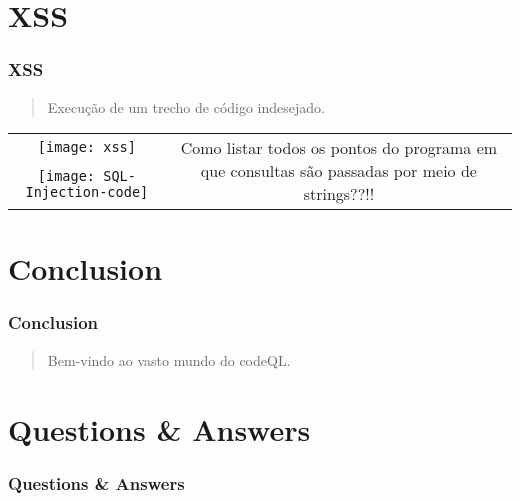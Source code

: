 \documentclass[10pt, aspectratio=169]{beamer}
\begin{document}
\section{XSS}
\begin{frame}
	\frametitle{XSS}
	
	\begin{quotation}
		Execução de um trecho de código indesejado. 
	\end{quotation}
	\begin{center}
		\begin{tabular}{c c}
			\texttt{[image: xss]} & \multirow{2}{4cm}{Como listar todos os pontos do programa em que consultas são passadas por meio de strings??!!}
			\\
			\texttt{[image: SQL-Injection-code]}
		\end{tabular}
		
	\end{center}
	
	
	
	
	\vfill
	\vfill
	
\end{frame}


\section{Conclusion}
\begin{frame}
  \frametitle{Conclusion}
  	\begin{quotation}
  	Bem-vindo ao vasto mundo do codeQL. 
  \end{quotation}
  
 \end{frame}


\section{Questions \& Answers}
\begin{frame}
  \frametitle{Questions \& Answers}

  \begin{quotation}
  \end{quotation}
  \flushright

\end{frame}
\end{document}
